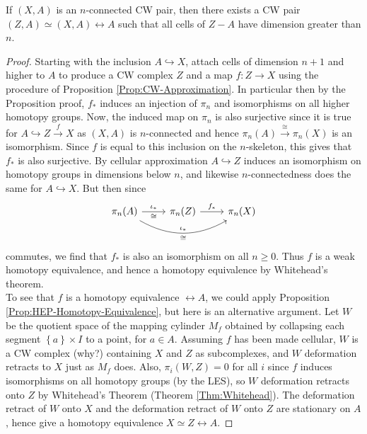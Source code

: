 \begin{proposition}[]
    If $\left( X,A \right) $ is an $n$-connected
    CW pair, then there exists a CW pair
    $\left( Z,A \right) \simeq \left( X,A \right) \rel A$ 
    such that all cells of $Z - A$ have dimension greater
    than $n$.
\end{proposition}

\begin{proof}
    Starting with the inclusion
    $A \hookrightarrow X$, attach cells of
    dimension $n+1$ and higher to
    $A$ to produce a CW complex $Z$ and
    a map $f \colon Z \to X$ using the
    procedure of Proposition \ref{Prop:CW-Approximation}.
    In particular then
    by the Proposition proof,
    $f_*$ induces an injection of
    $\pi_n$ and isomorphisms on all higher homotopy groups.
    Now, the induced map on $\pi_n$ is also
    surjective since it is true for
    $A \hookrightarrow Z \stackrel{f}{\to} X$ 
    as $\left( X,A \right) $ is $n$-connected and hence
    $\pi_n (A) \stackrel{\cong}{\to}  \pi_n(X)$ is an isomorphism.
    Since $f$ is equal to this inclusion on the
    $n$-skeleton, this gives that $f_*$ is also surjective.
    By cellular approximation
    $A \hookrightarrow Z$ induces an isomorphism
    on homotopy groups in dimensions below $n$, and
    likewise $n$-connectedness does the same for
    $A \hookrightarrow X$. But then since
    \begin{equation*}
    \begin{tikzcd}
        \pi_n (A) \ar[rr, bend right, "\iota_*",
        "\cong"'] 
        \ar[r, "\iota_*", "\cong"'] & 
        \pi_n (Z) \ar[r,"f_*"] & 
        \pi_n (X)
    \end{tikzcd}
    \end{equation*}
    commutes, we find that $f_*$ is also an
    isomorphism on all $n\ge 0$.
    Thus $f$ is a weak homotopy equivalence, and hence
    a homotopy equivalence by Whitehead's theorem.\\

    To see that $f$ is a homotopy equivalence
    $\rel A$, we could apply Proposition 
    \ref{Prop:HEP-Homotopy-Equivalence}, but
    here is an alternative argument. Let
    $W$ be the quotient space of the mapping cylinder
    $M_f$ obtained by collapsing each segment
    $\left\{ a \right\} \times I$ to a point, for
    $a \in A$. Assuming $f$ has been made cellular,
    $W$ is a CW complex (why?) containing $X$ and $Z$ as
    subcomplexes, and $W$ deformation retracts
    to $X$ just as $M_f$ does. Also,
    $\pi_i \left( W,Z \right) = 0$ for all
    $i$ since $f$ induces isomorphisms on all
    homotopy groups (by the LES), so $W$ deformation retracts
    onto $Z$ by Whitehead's Theorem (Theorem \ref{Thm:Whitehead}).
    The deformation retract of $W$ onto $X$ and the
    deformation retract of $W$ onto $Z$ are stationary
    on $A$, hence give a homotopy equivalence
    $X \simeq Z \rel A$.
\end{proof}

